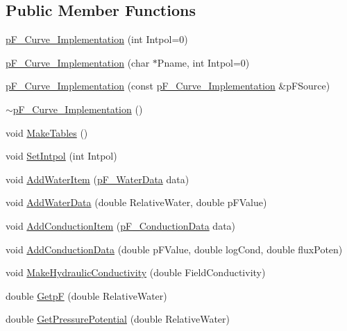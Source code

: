\subsection*{Public Member Functions}
\begin{DoxyCompactItemize}
\item 
\hyperlink{classp_f___curve___implementation_a86be0b163ac80b4ecb0a2e7486bfa7d9}{pF\_\-Curve\_\-Implementation} (int Intpol=0)
\item 
\hyperlink{classp_f___curve___implementation_a5e0578b3de98bb56eea5b40a24961659}{pF\_\-Curve\_\-Implementation} (char $\ast$Pname, int Intpol=0)
\item 
\hyperlink{classp_f___curve___implementation_a7d1368d2fa1f8b27237c43830ec03c56}{pF\_\-Curve\_\-Implementation} (const \hyperlink{classp_f___curve___implementation}{pF\_\-Curve\_\-Implementation} \&pFSource)
\item 
\hyperlink{classp_f___curve___implementation_a1741e2601605b0fa1a7f578d4df25528}{$\sim$pF\_\-Curve\_\-Implementation} ()
\item 
void \hyperlink{classp_f___curve___implementation_ada7b4e4d08e6af2dc5df656853506104}{MakeTables} ()
\item 
void \hyperlink{classp_f___curve___implementation_a7c68c1d6ef72351fb8b24115aa89c057}{SetIntpol} (int Intpol)
\item 
void \hyperlink{classp_f___curve___implementation_a40f6e22b2fc11a97d03c8cd78a1ece91}{AddWaterItem} (\hyperlink{structp_f___water_data}{pF\_\-WaterData} data)
\item 
void \hyperlink{classp_f___curve___implementation_a6a802dc0367c94d8ff8bb800996ad77a}{AddWaterData} (double RelativeWater, double pFValue)
\item 
void \hyperlink{classp_f___curve___implementation_a9a54fe612db1222fae231f08c154b065}{AddConductionItem} (\hyperlink{structp_f___conduction_data}{pF\_\-ConductionData} data)
\item 
void \hyperlink{classp_f___curve___implementation_a690f9e12e86f868727a05eccaedf770b}{AddConductionData} (double pFValue, double logCond, double fluxPoten)
\item 
void \hyperlink{classp_f___curve___implementation_a7513fc9233b0844f592e904e1b17cb81}{MakeHydraulicConductivity} (double FieldConductivity)
\item 
double \hyperlink{classp_f___curve___implementation_aa242b6233b8d7c729fb09134d13577c3}{GetpF} (double RelativeWater)
\item 
double \hyperlink{classp_f___curve___implementation_a813897da0ebdbb1bda26ce032f664a9e}{GetPressurePotential} (double RelativeWater)

\end{DoxyCompactItemize}
